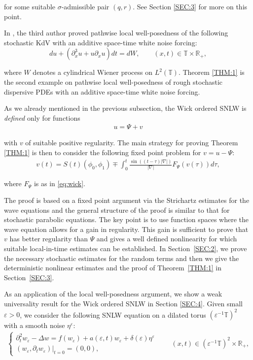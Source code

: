 \documentclass[letterpaper, 11pt,  reqno]{amsart}
\newcommand{\1}{\hspace{0.5mm}\text{I}\hspace{0.5mm}}
\newcommand{\noi}{\noindent}
\newcommand{\R}{\mathbb{R}}
\newcommand{\T}{\mathbb{T}}
\newcommand{\Dl}{\Delta}
\newcommand{\eps}{\varepsilon}
\newcommand{\s}{\sigma}
\newcommand{\dx}{\partial_x}
\newcommand{\dt}{\partial_t}
\numberwithin{equation}{section}
\numberwithin{theorem}{section}
\begin{document}
\noi
for some suitable $\s$-admissible pair $(q, r)$.
See Section \ref{SEC:3} for more on this point.


In \cite{Oh}, the third author proved pathwise local well-posedness of  
the following stochastic KdV
 with an additive space-time white noise
forcing:
\[ d u + (\dx^3 u  + u \dx u)dt =dW, \qquad (x, t) \in \T \times \R_+, \]

\noi
where $W$ denotes
a cylindrical Wiener process on $L^2(\T)$.
Theorem \ref{THM:1} is the second example on pathwise local well-posedness 
of rough stochastic dispersive PDEs
 with an additive space-time white noise forcing.
 
 
 
As we already mentioned in the previous subsection, 
the Wick ordered SNLW is \emph{defined} only for functions 
\begin{align}
u = \Psi+v
\label{decomp}
\end{align}

\noi
 with $v$ of suitable positive regularity. 
The main strategy for proving  Theorem \ref{THM:1} 
is then to consider the following fixed point problem for $v = u  - \Psi$:
\begin{align}
v(t)= 
S(t) (\phi_0, \phi_1)
 \mp \int_{0}^t  \frac{\sin ((t-\tau)|\nabla|)}{|\nabla|}  F_\Psi(v(\tau)) d\tau,
\label{SNLW9}
\end{align}

\noi
where $F_\Psi$ is as in \eqref{eq:wick}.

The proof is based on a fixed point argument via the Strichartz estimates
for the wave equations and  the general structure of the proof is similar to that 
for stochastic parabolic equations. The key point is to use function spaces
where the wave equation allows for a gain in regularity. 
This gain is sufficient to prove that $v$ has better regularity than $\Psi$ and gives a
well defined nonlinearity for which suitable local-in-time estimates can be established.  
In Section~\ref{SEC:2},  we prove the necessary
stochastic estimates for the random terms and then we give the
deterministic nonlinear estimates and the proof of
Theorem~\ref{THM:1} in Section~\ref{SEC:3}.



As an application of the local well-posedness argument, 
we  show a weak universality result for the Wick ordered SNLW
in Section \ref{SEC:4}.
Given small $\eps > 0$, we consider the following  SNLW equation 
on a dilated torus $(\eps^{- 1} \T)^2$ 
with a smooth noise $\eta^\eps$:
\begin{align*}
\begin{cases}
 \dt^2 w_\eps - \Dl w = f (w_\eps) + a (\eps, t) w_\eps + \delta   (\eps) \eta^\eps \\
 (w_\eps, \dt w_\eps) |_{t = 0} = (0, 0),
\end{cases}
\qquad 
(x, t)\in (\eps^{- 1} \T)^2 \times \R_+, 
\end{align*}
\end{document}
